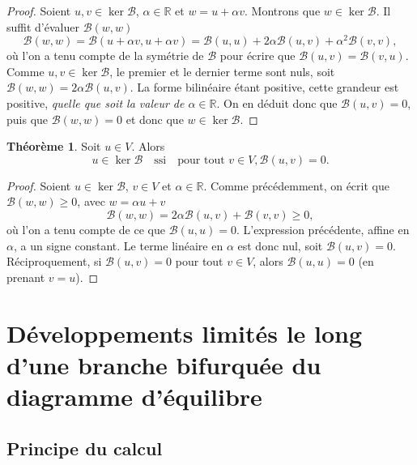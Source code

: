 \documentclass[12pt, final]{amsart}
\theoremstyle{definition}
\newtheorem{theorem}{Théorème}
\begin{document}
\begin{proof}
  Soient $u, v∈\ker \mathcal{B}$, $α∈\mathbb{R}$ et $w = u +
  α v$. Montrons que $w∈\ker \mathcal{B}$. Il suffit d'évaluer
  $\mathcal{B} (w, w)$
  \begin{equation}
    \mathcal{B} (w, w) =\mathcal{B} (u + α v, u + α v) =\mathcal{B}
    (u, u) + 2 α \mathcal{B} (u, v) + α^2 \mathcal{B} (v, v),
  \end{equation}
  où l'on a tenu compte de la symétrie de $\mathcal{B}$ pour
  écrire que $\mathcal{B} (u, v) =\mathcal{B} (v, u)$. Comme $u, v \in
  \ker \mathcal{B}$, le premier et le dernier terme sont nuls, soit
  $\mathcal{B} (w, w) = 2 α \mathcal{B} (u, v)$. La forme bilinéaire
  étant positive, cette grandeur est positive, \emph{quelle que soit la
  valeur de $α∈\mathbb{R}$}. On en déduit donc que $\mathcal{B}
  (u, v) = 0$, puis que $\mathcal{B} (w, w) = 0$ et donc que $w∈\ker
  \mathcal{B}.$
\end{proof}

\begin{theorem}
  Soit $u∈V$. Alors
  \begin{equation}
    u∈\ker \mathcal{B} \quad \text{ssi} \quad \text{pour tout } v∈V,
    \mathcal{B} (u, v) = 0.
  \end{equation}
\end{theorem}

\begin{proof}
  Soient $u∈\ker \mathcal{B}$, $v∈V$ et $α∈\mathbb{R}$. Comme
  précédemment, on écrit que $\mathcal{B} (w, w) \geq 0$, avec $w
  = α u + v$
  \begin{equation}
    \mathcal{B} (w, w) = 2 α \mathcal{B} (u, v) +\mathcal{B} (v, v) \geq
    0,
  \end{equation}
  où l'on a tenu compte de ce que $\mathcal{B} (u, u) = 0$. L'expression
  précédente, affine en $α$, a un signe constant. Le terme
  linéaire en $α$ est donc nul, soit $\mathcal{B} (u, v) = 0$.
  Réciproquement, si $\mathcal{B} (u, v) = 0$ pour tout $v∈V$, alors
  $\mathcal{B} (u, u) = 0$ (en prenant $v = u$).
\end{proof}

\section{Développements limités le long d'une branche bifurquée du
diagramme d'équilibre}

\subsection{Principe du calcul}\label{sec20220107121442}
\end{document}
